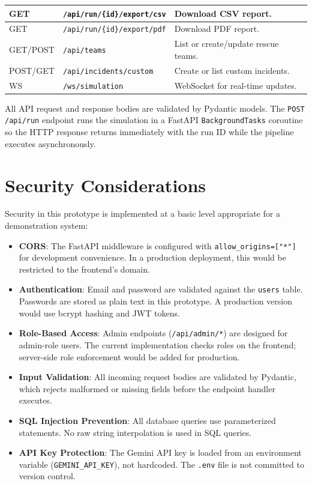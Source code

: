 \begin{table}[H]
\begin{tabularx}{\textwidth}{|l|l|X|}
\hline
GET & \texttt{/api/run/\{id\}/export/csv} & Download CSV report. \\
\hline
GET & \texttt{/api/run/\{id\}/export/pdf} & Download PDF report. \\
\hline
GET/POST & \texttt{/api/teams} & List or create/update rescue teams. \\
\hline
POST/GET & \texttt{/api/incidents/custom} & Create or list custom incidents. \\
\hline
WS & \texttt{/ws/simulation} & WebSocket for real-time updates. \\
\hline
\end{tabularx}
\end{table}

All API request and response bodies are validated by Pydantic models. The \texttt{POST /api/run} endpoint runs the simulation in a FastAPI \texttt{BackgroundTasks} coroutine so the HTTP response returns immediately with the run ID while the pipeline executes asynchronously.

\section{Security Considerations}
\label{sec:security}

Security in this prototype is implemented at a basic level appropriate for a demonstration system:

\begin{itemize}[leftmargin=*]
    \item \textbf{CORS}: The FastAPI middleware is configured with \texttt{allow\_origins=["*"]} for development convenience. In a production deployment, this would be restricted to the frontend's domain.

    \item \textbf{Authentication}: Email and password are validated against the \texttt{users} table. Passwords are stored as plain text in this prototype. A production version would use bcrypt hashing and JWT tokens.

    \item \textbf{Role-Based Access}: Admin endpoints (\texttt{/api/admin/*}) are designed for admin-role users. The current implementation checks roles on the frontend; server-side role enforcement would be added for production.

    \item \textbf{Input Validation}: All incoming request bodies are validated by Pydantic, which rejects malformed or missing fields before the endpoint handler executes.

    \item \textbf{SQL Injection Prevention}: All database queries use parameterized statements. No raw string interpolation is used in SQL queries.

    \item \textbf{API Key Protection}: The Gemini API key is loaded from an environment variable (\texttt{GEMINI\_API\_KEY}), not hardcoded. The \texttt{.env} file is not committed to version control.
\end{itemize}


